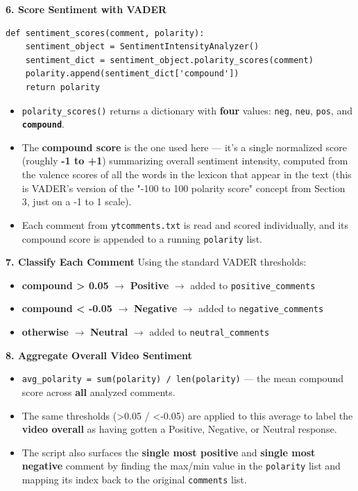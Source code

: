 \documentclass[12pt,openany]{book}
\begin{document}
\textbf{6. Score Sentiment with VADER}
\begin{Verbatim}[breaklines=true,breakanywhere=true,fontsize=\small]
def sentiment_scores(comment, polarity):
    sentiment_object = SentimentIntensityAnalyzer()
    sentiment_dict = sentiment_object.polarity_scores(comment)
    polarity.append(sentiment_dict['compound'])
    return polarity
\end{Verbatim}
\begin{itemize}[leftmargin=*]
    \item \texttt{polarity\_scores()} returns a dictionary with \textbf{four} values: \texttt{neg}, \texttt{neu}, \texttt{pos}, and \textbf{\texttt{compound}}.
    \item The \textbf{compound score} is the one used here --- it's a single normalized score (roughly \textbf{-1 to +1}) summarizing overall sentiment intensity, computed from the valence scores of all the words in the lexicon that appear in the text (this is VADER's version of the "-100 to 100 polarity score" concept from Section 3, just on a -1 to 1 scale).
    \item Each comment from \texttt{ytcomments.txt} is read and scored individually, and its compound score is appended to a running \texttt{polarity} list.
\end{itemize}

\textbf{7. Classify Each Comment}
Using the standard VADER thresholds:
\begin{itemize}[leftmargin=*]
    \item \textbf{compound > 0.05} \(\rightarrow\) \textbf{Positive} \(\rightarrow\) added to \texttt{positive\_comments}
    \item \textbf{compound < -0.05} \(\rightarrow\) \textbf{Negative} \(\rightarrow\) added to \texttt{negative\_comments}
    \item \textbf{otherwise} \(\rightarrow\) \textbf{Neutral} \(\rightarrow\) added to \texttt{neutral\_comments}
\end{itemize}

\textbf{8. Aggregate Overall Video Sentiment}
\begin{itemize}[leftmargin=*]
    \item \texttt{avg\_polarity = sum(polarity) / len(polarity)} --- the mean compound score across \textbf{all} analyzed comments.
    \item The same thresholds (>0.05 / <-0.05) are applied to this average to label the \textbf{video overall} as having gotten a Positive, Negative, or Neutral response.
    \item The script also surfaces the \textbf{single most positive} and \textbf{single most negative} comment by finding the max/min value in the \texttt{polarity} list and mapping its index back to the original \texttt{comments} list.
\end{itemize}
\end{document}
